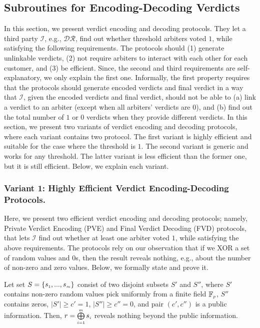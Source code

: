 
\subsection{Subroutines for  Encoding-Decoding Verdicts}


In this section, we present verdict encoding and decoding protocols. They let a third party $\mathcal{I}$, e.g., $\mathcal{DR}$, find out whether threshold  arbiters voted $1$, while satisfying the following  requirements.  The protocols should (1) generate unlinkable verdicts, (2)  not require arbiters to interact with each other for each customer, and (3) be  efficient. Since, the second and third requirements are self-explanatory,  we only explain the first one.  Informally, the first property requires  that the protocols should generate encoded verdicts and final verdict in a way that $\mathcal{I}$,  given the encoded verdicts and final verdict, should not be able to (a)   link a  verdict to an arbiter (except when all arbiters' verdicts are $0$), and (b) find out the total number of $1$ or $0$ verdicts when they provide different verdicts.  In this section, we present two variants of verdict encoding and decoding protocols, where each variant contains two protocol. The first variant is highly efficient and suitable for the case where the threshold is $1$. The second variant is  generic and works for any threshold. The latter variant is less efficient than the former one, but it is still efficient. Below, we explain each variant. 


\subsubsection{Variant 1: Highly Efficient Verdict  Encoding-Decoding Protocols.}


Here, we present two efficient verdict encoding and decoding protocols; namely, Private Verdict Encoding (PVE) and Final Verdict Decoding (FVD) protocols, that lets $\mathcal{I}$ find out whether at least one arbiter voted $1$, while satisfying the above requirements.  The protocols rely on our observation that if we XOR a set of random values and $0$s, then the result   reveals nothing, e.g.,  about the number of non-zero and  zero values. Below, we formally state and prove it.  

\begin{theorem}\label{set-xor}
Let set $S=\{s_{\scriptscriptstyle 1},..., s_{\scriptscriptstyle m}\}$ consist of  two disjoint subsets $S'$ and $S''$, where $S'$ contains non-zero random values pick uniformly  from a finite field $\mathbb{F}_{\scriptscriptstyle p}$, $S''$ contains zeros, $|S'|\geq c'=1$, $|S''|\geq c''=0$, and pair $(c',c'')$ is a public information. Then, $r= \bigoplus\limits^{\scriptscriptstyle m}_{\scriptscriptstyle i=1} s_{\scriptscriptstyle i}$ reveals nothing beyond the public information.  
\end{theorem}

